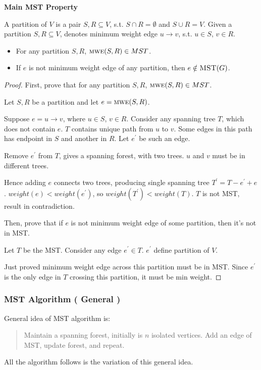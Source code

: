\noindent \textbf{Main MST Property}

A partition of $V$ is a pair $S,R \subseteq V$,
s.t. $S \cap R = \emptyset$ and $S \cup R = V$.
Given a partition $S,R \subseteq V$, 
denotes minimum weight edge $u\rightarrow v$, s.t. $u \in S$, $v \in R$.
\begin{itemize}
    \item For any partition $S,R$, $\textsc{mwe} (S,R) \in MST$.
    \item If $e$ is not minimum weight edge of any partition,
        then $e \notin \textsc{MST} (G)$.
\end{itemize}

\begin{proof}
    First, prove that for any partition $S,R$, $\textsc{mwe} (S,R) \in MST$.

    Let $S,R$ be a partition and let $e = \textsc{mwe} (S,R)$.

    Suppose $e = u \rightarrow v$, where $u \in S$, $v \in R$.
    Consider any spanning tree $T$, which does not contain $e$.
    $T$ contains unique path from $u$ to $v$.
    Some edges in this path has endpoint in $S$ and another in $R$.
    Let $e^\prime$ be such an edge.

    Remove $e^\prime$ from $T$, gives a spanning forest, with two trees.
    $u$ and $v$ must be in different trees.

    Hence adding $e$ connects two trees, producing single spanning tree
    $T^\prime = T - e^\prime + e$. $weight(e) < weight(e^\prime)$, so $weight(T^\prime) < weight(T)$.
    $T$ is not MST, result in contradiction.

    Then, prove that if $e$ is not minimum weight edge of some partition,
    then it's not in MST.

    Let $T$ be the MST.
    Consider any edge $e^\prime \in T$. $e^\prime$ define partition of $V$.

    Just proved minimum weight edge across this partition must be in MST.
    Since $e^\prime$ is the only edge in $T$ crossing this partition,
    it must be min weight.
\end{proof}

\subsubsection{MST Algorithm ( General )}
General idea of MST algorithm is:
\begin{quote}
Maintain a spanning forest, initially is $n$ isolated vertices.
Add an edge of MST, update forest, and repeat.
\end{quote}
All the algorithm follows is the variation of this general idea.

